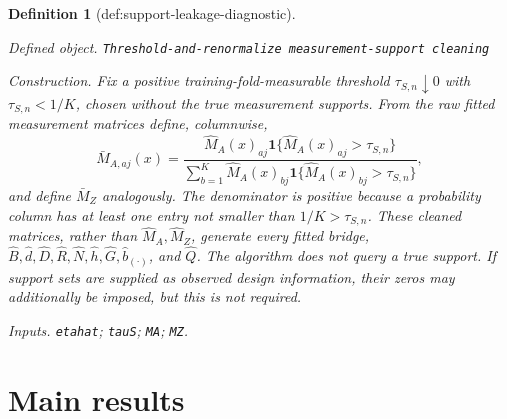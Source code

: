 \documentclass{article}
\newtheorem{definition}{Definition}
\begin{document}
\begin{definition}[def:support-leakage-diagnostic]\label{def:support-leakage-diagnostic}
\par\smallskip\noindent\emph{Defined object.} \texttt{Threshold-\allowbreak{}and-\allowbreak{}renormalize measurement-\allowbreak{}support cleaning}
\par\smallskip\noindent\emph{Construction.} Fix a positive training-fold-measurable threshold \(\tau_{S,n}\downarrow0\) with \(\tau_{S,n}<1/K\), chosen without the true measurement supports.  From the raw fitted measurement matrices define, columnwise,
\[
 \bar M_{A,aj}(x)=
 \frac{\widehat M_A(x)_{aj}\mathbf 1\{\widehat M_A(x)_{aj}>\tau_{S,n}\}}
 {\sum_{b=1}^K\widehat M_A(x)_{bj}\mathbf 1\{\widehat M_A(x)_{bj}>\tau_{S,n}\}},
\]
and define \(\bar M_Z\) analogously.  The denominator is positive because a probability column has at least one entry not smaller than \(1/K>\tau_{S,n}\).  These cleaned matrices, rather than \(\widehat M_A,\widehat M_Z\), generate every fitted bridge, \(\widehat B,\widehat d,\widehat D,\widehat R,\widehat N,\widehat h,\widehat G,\widehat b_{(\cdot)}\), and \(\widehat Q\).  The algorithm does not query a true support.  If support sets are supplied as observed design information, their zeros may additionally be imposed, but this is not required.
\par\smallskip\noindent\emph{Inputs.} \texttt{etahat}; \texttt{tauS}; \texttt{MA}; \texttt{MZ}.
\end{definition}

\section{Main results}
\end{document}
